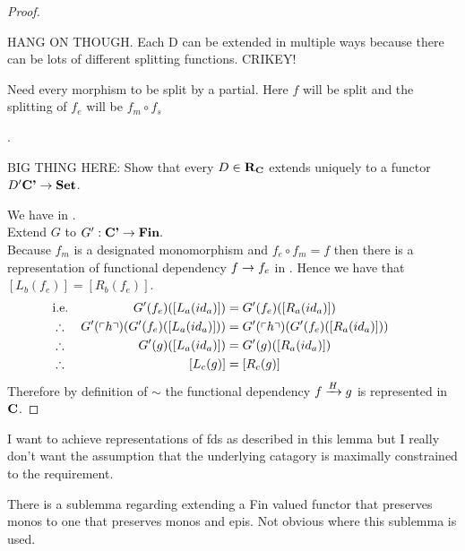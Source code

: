 \documentclass[12pt,a4paper]{article}
\theoremstyle{remark}
\begin{document}
\begin{proof}
\begin{newtt}
HANG ON THOUGH. Each D can be extended in multiple ways because there can be lots of different splitting functions. CRIKEY!

Need every morphism to be split by a partial. Here $f$ will be split and the splitting of $f_e$ will be $f_m \circ f_s$
\end{newtt}.

\begin{newtt}
BIG THING HERE: Show that every $D \in \reqtc$ extends uniquely to
a functor $D' \catcp \morph \Set$.
\end{newtt}

We have   in \catcp.\\
\medskip
Extend $G$ to $G':\catcp \morph \Fin.$ \\
Because $f_m$ is a designated monomorphism and $f_e \circ f_m = f$ then
there is a representation of functional dependency $f \morph f_e$ in \catc
{}.
Hence  we have that $[L_b(f_e)]= [R_b(f_e)]$.
\medskip
\begin{align*}
&\mbox{i.e.}& G'(f_e)([L_a(id_a)])              &= G'(f_e)([R_a(id_a)])       \\
&\therefore & G'(\qq{h}) (G'(f_e)([L_a(id_a)])) &= G'(\qq{h}) (G'(f_e)([R_a(id_a)])) \\
&\therefore & G'(g)([L_a(id_a)])              &= G'(g)([R_a(id_a)]) & &    \\
&\therefore & [L_c(g)] &= [R_c(g)] 
\end{align*}
Therefore by definition of $\sim$ the functional dependency
$\fundep{H}{f}{g}$ is represented in $\catc$. 
\end{proof}

I want to achieve representations of fds as described in this lemma but I really don't want the assumption that the underlying catagory is maximally constrained to the requirement.

There is a sublemma regarding extending a Fin valued functor that preserves monos to one that preserves monos and epis. Not obvious where this sublemma is used. 
\end{document}
